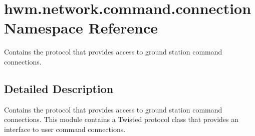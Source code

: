 \hypertarget{namespacehwm_1_1network_1_1command_1_1connection}{\section{hwm.\-network.\-command.\-connection Namespace Reference}
\label{namespacehwm_1_1network_1_1command_1_1connection}
}


Contains the protocol that provides access to ground station command connections.  




\subsection{Detailed Description}
Contains the protocol that provides access to ground station command connections. This module contains a Twisted protocol class that provides an interface to user command connections. 